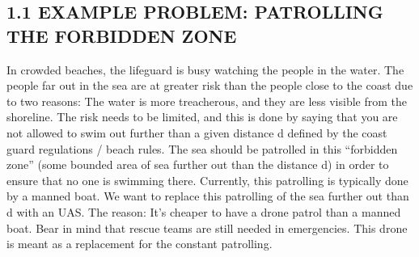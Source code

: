 \subsection*{1.1 EXAMPLE PROBLEM: PATROLLING THE FORBIDDEN ZONE}
In crowded beaches, the lifeguard is busy
 watching the people in the water. 
The people far out in the sea are at greater
 risk than the people close to the coast due
 to two reasons: The water is more treacherous,
 and they are less visible from the shoreline.
The risk needs to be limited, and this is done
 by saying that you are not allowed to swim out
 further than a given distance d defined by the 
coast guard regulations / beach rules. 
The sea should be patrolled in this “forbidden zone” 
(some bounded area of sea further out than the distance d)
 in order to ensure that no one is swimming there.
 Currently, this patrolling is typically done by a manned boat.
 We want to replace this patrolling of the sea
 further out than d with an UAS.
The reason: It’s cheaper to have a drone patrol 
than a manned boat. Bear in mind that rescue teams
 are still needed in emergencies. This drone is meant
 as a replacement for the constant patrolling. \newline

